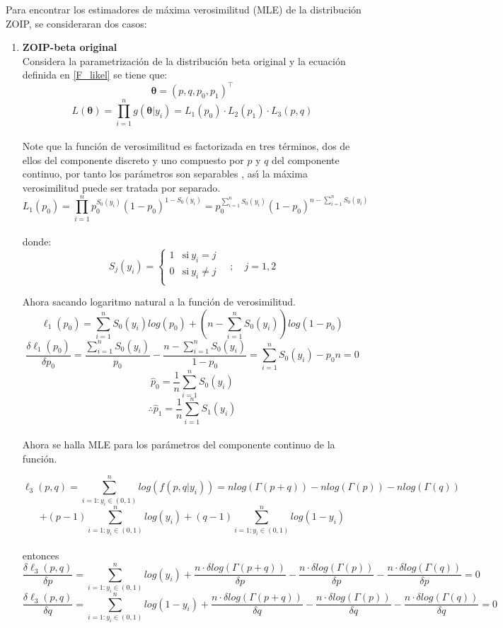 Para encontrar los estimadores de m\'{a}xima verosimilitud (MLE) de la distribuci\'{o}n ZOIP, se consideraran dos casos:

\begin{enumerate}
	\item \textbf{ZOIP-beta original}\\
	Considera la parametrizaci\'{o}n de la distribuci\'{o}n beta original y la ecuaci\'{o}n definida en \eqref{F_likel} se tiene que:
	\[
	\boldsymbol{\theta}=(p,q,p_0,p_1)^{\top}
	\]
	\[
	L(\boldsymbol{\theta})=\prod_{i=1}^{n}g(\boldsymbol{\theta}|y_i)=L_1(p_0)\cdot L_2(p_1) \cdot L_3(p,q)
	\]
	\\
Note que la funci\'{o}n de verosimilitud es factorizada en tres t\'{e}rminos, dos de ellos del componente discreto y uno compuesto por $p$ y $q$ del componente continuo, por tanto los par\'{a}metros son separables \citep{Pace1}, as\'{\i} la m\'{a}xima verosimilitud puede ser tratada por separado.\\
\[
L_1(p_0)=\prod_{i=1}^{n}p_0^{S_0(y_i)}(1-p_0)^{1-S_0(y_i)}=p_0^{\sum_{i=1}^{n}{S_0(y_i)}}(1-p_0)^{n-\sum_{i=1}^{n}{S_0(y_i)}}
\]
\\
donde:
\begin{equation}
S_j(y_i)=
\begin{cases}
1 & \text{si}\ y_i=j\\
0 & \text{si}\ y_i\neq j\\
\end{cases}
\quad ; \quad j=1,2 \label{Sj}
\end{equation}

Ahora sacando logaritmo natural a la funci\'{o}n de verosimilitud.
\[
\ell_1(p_0)=\sum_{i=1}^{n}{S_0(y_i)log(p_0)}+(n-\sum_{i=1}^{n}{S_0(y_i)})log(1-p_0)
\]	
\[
\frac{\delta \ell_1(p_0)}{\delta p_0}=\frac{\sum_{i=1}^{n}{S_0(y_i)}}{p_0}-\frac{n-\sum_{i=1}^{n}{S_0(y_i)}}{1-p_0}=\sum_{i=1}^{n}{S_0(y_i)}-p_0n=0
\]
\[
\hat{p}_0=\frac{1}{n}\sum_{i=1}^{n}{S_0(y_i)}
\]
\[
\therefore \hat{p}_1=\frac{1}{n}\sum_{i=1}^{n}{S_1(y_i)}
\]
\\
Ahora se halla MLE para los par\'{a}metros del componente continuo de la funci\'{o}n.

\[
\ell_3(p,q)=\sum_{i=1:y_i \in (0,1)}^{n}{log(f(p,q|y_i))}=n log(\Gamma(p+q))-n log(\Gamma(p))-n log(\Gamma(q))
\]
\[
+(p-1)\sum_{i=1:y_i \in (0,1)}^{n}{log(y_i)}+(q-1)\sum_{i=1:y_i \in (0,1)}^{n}{log(1-y_i)}
\]
\\
entonces
\[
\frac{\delta \ell_3(p,q)}{\delta p}=\sum_{i=1:y_i \in (0,1)}^{n}{log(y_i)}+\frac{n \cdot \delta log(\Gamma(p+q))}{\delta p}- \frac{n \cdot \delta log(\Gamma(p))}{\delta p}-\frac{n\cdot \delta log(\Gamma(q))}{\delta p}=0
\]
\[
\frac{\delta \ell_3(p,q)}{\delta q}=\sum_{i=1:y_i \in (0,1)}^{n}{log(1-y_i)}+\frac{n \cdot \delta log(\Gamma(p+q))}{\delta q}- \frac{n \cdot \delta log(\Gamma(p))}{\delta q}-\frac{n\cdot \delta log(\Gamma(q))}{\delta q}=0
\]


\end{enumerate}
